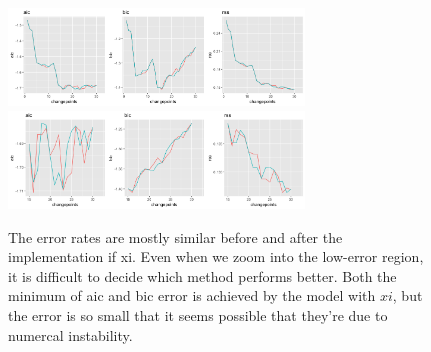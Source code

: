 \documentclass[11pt]{article}
\begin{document}
\begin{figure}[h]
\centering
\includegraphics[width=0.7\textwidth]{errorplot.png}\\
\includegraphics[width=0.7\textwidth]{errorplot2.png}
\caption{The error rates are mostly similar before and after the implementation if xi. Even when we zoom into the low-error region, it is difficult to decide which method performs better. Both the minimum of aic and bic error is achieved by the model with $xi$, but the error is so small that it seems possible that they're due to numercal instability.}
\label{errorplots}
\end{figure}

\pagebreak
\end{document}
